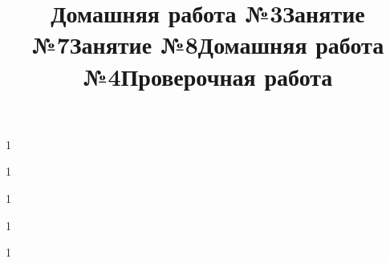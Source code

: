 \newpage
\title{Домашняя работа №3}
\begin{listofex}
	\item 1
\end{listofex}
\newpage
\title{Занятие №7}
\begin{listofex}
	\item 1
\end{listofex}
\newpage
\title{Занятие №8}
\begin{listofex}
	\item 1
\end{listofex}
\newpage
\title{Домашняя работа №4}
\begin{listofex}
	\item 1
\end{listofex}
\newpage
\title{Проверочная работа}
\begin{listofex}
	\item 1
\end{listofex}